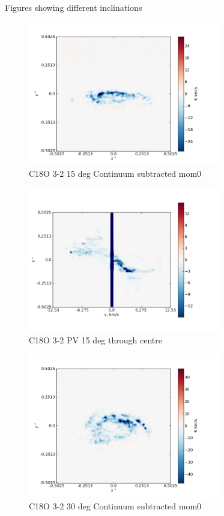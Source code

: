 \documentclass[useAMS,usenatbib]{mn2e}
\begin{document}
Figures showing different inclinations  
\begin{figure}
 \includegraphics[width=84mm]{Figures/sim/imageC18O_3-2_15deg_contSub.png}

 \caption{C18O 3-2 15 deg Continuum subtracted mom0}
\end{figure}

%

\begin{figure}
 \includegraphics[width=84mm]{Figures/sim/imageC18O_3-2_15deg_PV_centre.png}

 \caption{C18O 3-2 PV 15 deg through centre}
\end{figure}


\begin{figure}
 \includegraphics[width=84mm]{Figures/sim/imageC18O_3-2_30deg_contSub.png}

 \caption{C18O 3-2  30 deg Continuum subtracted mom0}
\end{figure}
\end{document}

